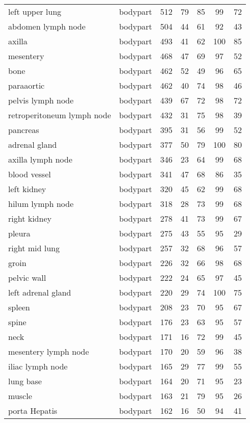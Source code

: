 \documentclass[runningheads]{llncs}
\begin{document}
\begin{table}[]
\begin{tabular}{p{3.6cm}cccccc}
		left upper lung	&  bodypart	& 512	& 79	& 85	& 99	& 72 \\
		abdomen lymph node	&  bodypart	& 504	& 44	& 61	& 92	& 43 \\
		axilla	&  bodypart	& 493	& 41	& 62	& 100	& 85 \\
		mesentery	&  bodypart	& 468	& 47	& 69	& 97	& 52 \\
		bone	&  bodypart	& 462	& 52	& 49	& 96	& 65 \\
		paraaortic	&  bodypart	& 462	& 40	& 74	& 98	& 46 \\
		pelvis lymph node	&  bodypart	& 439	& 67	& 72	& 98	& 72 \\
		retroperitoneum lymph node	&  bodypart	& 432	& 31	& 75	& 98	& 39 \\
		pancreas	&  bodypart	& 395	& 31	& 56	& 99	& 52 \\
		adrenal gland	&  bodypart	& 377	& 50	& 79	& 100	& 80 \\
		axilla lymph node	&  bodypart	& 346	& 23	& 64	& 99	& 68 \\
		blood vessel	&  bodypart	& 341	& 47	& 68	& 86	& 35 \\
		left kidney	&  bodypart	& 320	& 45	& 62	& 99	& 68 \\
		hilum lymph node	&  bodypart	& 318	& 28	& 73	& 99	& 68 \\
		right kidney	&  bodypart	& 278	& 41	& 73	& 99	& 67 \\
		pleura	&  bodypart	& 275	& 43	& 55	& 95	& 29 \\
		right mid lung	&  bodypart	& 257	& 32	& 68	& 96	& 57 \\
		groin	&  bodypart	& 226	& 32	& 66	& 98	& 68 \\
		pelvic wall	&  bodypart	& 222	& 24	& 65	& 97	& 45 \\
		left adrenal gland	&  bodypart	& 220	& 29	& 74	& 100	& 75 \\
		spleen	&  bodypart	& 208	& 23	& 70	& 95	& 67 \\
		spine	&  bodypart	& 176	& 23	& 63	& 95	& 57 \\
		neck	&  bodypart	& 171	& 16	& 72	& 99	& 45 \\
		mesentery lymph node	&  bodypart	& 170	& 20	& 59	& 96	& 38 \\
		iliac lymph node	&  bodypart	& 165	& 29	& 77	& 99	& 55 \\
		lung base	&  bodypart	& 164	& 20	& 71	& 95	& 23 \\
		muscle	&  bodypart	& 163	& 21	& 79	& 95	& 26 \\
		porta Hepatis	&  bodypart	& 162	& 16	& 50	& 94	& 41 \\

\end{tabular}
\end{table}
\end{document}

